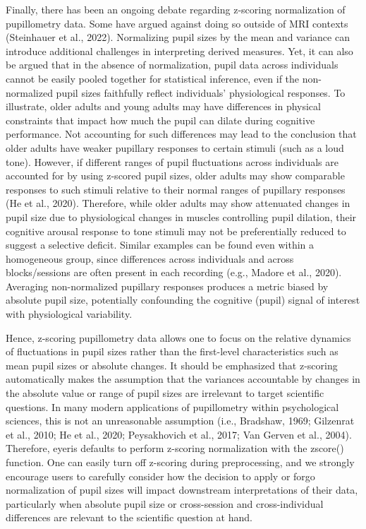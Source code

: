 Finally, there has been an ongoing debate regarding z-scoring normalization of pupillometry data. Some have argued against doing so outside of MRI contexts (Steinhauer et al., 2022). Normalizing pupil sizes by the mean and variance can introduce additional challenges in interpreting derived measures. Yet, it can also be argued that in the absence of normalization, pupil data across individuals cannot be easily pooled together for statistical inference, even if the non-normalized pupil sizes faithfully reflect individuals’ physiological responses. To illustrate, older adults and young adults may have differences in physical constraints that impact how much the pupil can dilate during cognitive performance. Not accounting for such differences may lead to the conclusion that older adults have weaker pupillary responses to certain stimuli (such as a loud tone). However, if different ranges of pupil fluctuations across individuals are accounted for by using z-scored pupil sizes, older adults may show comparable responses to such stimuli relative to their normal ranges of pupillary responses (He et al., 2020). Therefore, while older adults may show attenuated changes in pupil size due to physiological changes in muscles controlling pupil dilation, their cognitive arousal response to tone stimuli may not be preferentially reduced to suggest a selective deficit. Similar examples can be found even within a homogeneous group, since differences across individuals and across blocks/sessions are often present in each recording (e.g., Madore et al., 2020). Averaging non-normalized pupillary responses produces a metric biased by absolute pupil size, potentially confounding the cognitive (pupil) signal of interest with physiological variability.

Hence, z-scoring pupillometry data allows one to focus on the relative dynamics of fluctuations in pupil sizes rather than the first-level characteristics such as mean pupil sizes or absolute changes. It should be emphasized that z-scoring automatically makes the assumption that the variances accountable by changes in the absolute value or range of pupil sizes are irrelevant to target scientific questions. In many modern applications of pupillometry within psychological sciences, this is not an unreasonable assumption (i.e., Bradshaw, 1969; Gilzenrat et al., 2010; He et al., 2020; Peysakhovich et al., 2017; Van Gerven et al., 2004). Therefore, eyeris defaults to perform z-scoring normalization with the zscore() function. One can easily turn off z-scoring during preprocessing, and we strongly encourage users to carefully consider how the decision to apply or forgo normalization of pupil sizes will impact downstream interpretations of their data, particularly when absolute pupil size or cross-session and cross-individual differences are relevant to the scientific question at hand.

